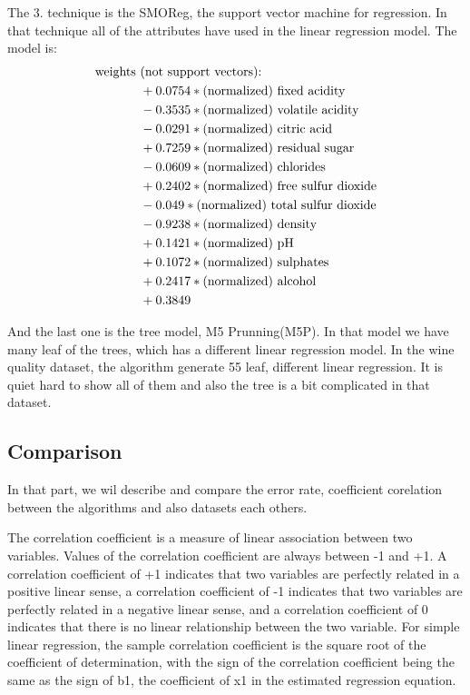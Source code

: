 \documentclass[a4paper]{article}
\begin{document}
The 3. technique is the SMOReg, the support vector machine for regression. In that technique all of the attributes have used in the linear regression model. The model is:
\begin{align*}
\textnormal{weights }& \textnormal{(not support vectors):} \\
& +       0.0754 * \textnormal{(normalized) fixed acidity}\\
& -       0.3535 * \textnormal{(normalized) volatile acidity}\\
& -       0.0291 * \textnormal{(normalized) citric acid}\\
& +       0.7259 * \textnormal{(normalized) residual sugar}\\
& -       0.0609 * \textnormal{(normalized) chlorides}\\
& +       0.2402 * \textnormal{(normalized) free sulfur dioxide}\\
& -       0.049  * \textnormal{(normalized) total sulfur dioxide}\\
& -       0.9238 * \textnormal{(normalized) density}\\
& +       0.1421 * \textnormal{(normalized) pH}\\
& +       0.1072 * \textnormal{(normalized) sulphates}\\
& +       0.2417 * \textnormal{(normalized) alcohol}\\
& +       0.3849\\
 \end{align*}

And the last one is the tree model, M5 Prunning(M5P). In that model we have many leaf of the trees, which has a different linear regression model. In the wine quality dataset, the algorithm generate 55 leaf, different linear regression. It is quiet hard to show all of them and also the tree is a bit complicated in that dataset.


\subsection{Comparison}

In that part, we wil describe and compare the error rate, coefficient corelation between the algorithms and also datasets each others. 

The correlation coefficient is a measure of linear association between two variables. Values of the correlation coefficient are always between -1 and +1. A correlation coefficient of +1 indicates that two variables are perfectly related in a positive linear sense, a correlation coefficient of -1 indicates that two variables are perfectly related in a negative linear sense, and a correlation coefficient of 0 indicates that there is no linear relationship between the two variable. For simple linear regression, the sample correlation coefficient is the square root of the coefficient of determination, with the sign of the correlation coefficient being the same as the sign of b1, the coefficient of x1 in the estimated regression equation.
\end{document}
